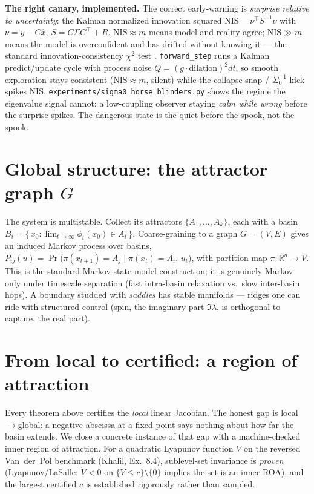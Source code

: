 \documentclass[11pt]{article}
\theoremstyle{definition}
\newcommand{\R}{\mathbb{R}}
\begin{document}
\begin{verifybox}
\textbf{The right canary, implemented.} The correct early-warning is \emph{surprise
relative to uncertainty}: the Kalman normalized innovation squared
$\mathrm{NIS}=\nu^\top S^{-1}\nu$ with $\nu=y-C\hat x$, $S=C\Sigma C^\top + R$.
$\mathrm{NIS}\approx m$ means model and reality agree; $\mathrm{NIS}\gg m$ means the model
is overconfident and has drifted without knowing it --- the standard innovation-consistency
$\chi^2$ test \cite{barshalom2001}. \texttt{forward\_step} runs a Kalman predict/update
cycle with process noise $Q=(g\cdot\text{dilation})^2 dt$, so smooth exploration stays
consistent (NIS$\approx m$, silent) while the collapse snap / $\Sigma_0^{-1}$ kick spikes
NIS. \texttt{experiments/sigma0\_horse\_blinders.py} shows the regime the eigenvalue signal
cannot: a low-coupling observer staying \emph{calm while wrong} before the surprise spikes.
The dangerous state is the quiet before the spook, not the spook.
\end{verifybox}

\section{Global structure: the attractor graph $G$}
\label{sec:graph}
The system is multistable. Collect its attractors $\{A_1,\dots,A_k\}$, each with a basin
$B_i = \{\, x_0 : \lim_{t\to\infty}\phi_t(x_0) \in A_i \,\}$. Coarse-graining to a graph
$G=(V,E)$ gives an induced Markov process over basins,
$P_{ij}(u) = \Pr\!\big(\pi(x_{t+1}) = A_j \mid \pi(x_t) = A_i,\, u_t\big)$, with partition
map $\pi:\R^n\to V$. This is the standard Markov-state-model construction; it is genuinely
Markov only under timescale separation (fast intra-basin relaxation vs.\ slow inter-basin
hops). A boundary studded with \emph{saddles} has stable manifolds --- ridges one can ride
with structured control (spin, the imaginary part $\Im\lambda$, is orthogonal to capture,
the real part).

\section{From local to certified: a region of attraction}
\label{sec:roa}
Every theorem above certifies the \emph{local} linear Jacobian. The honest gap is
local$\to$global: a negative abscissa at a fixed point says nothing about how far the basin
extends. We close a concrete instance of that gap with a machine-checked inner region of
attraction. For a quadratic Lyapunov function $V$ on the reversed Van~der~Pol benchmark
(Khalil, Ex.~8.4), sublevel-set invariance is \emph{proven} (Lyapunov/LaSalle: $\dot V<0$ on
$\{V\le c\}\setminus\{0\}$ implies the set is an inner ROA), and the largest certified $c$ is
established rigorously rather than sampled.
\end{document}
